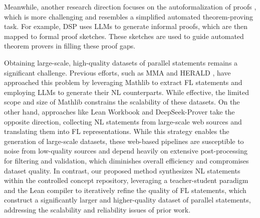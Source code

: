 Meanwhile, another research direction focuses on the autoformalization of proofs \citep{proof_1, proof_2, proof_3, internlm_math_plus}, which is more challenging and resembles a simplified automated theorem-proving task. For example, DSP \citep{proof_1} uses LLMs to generate informal proofs, which are then mapped to formal proof sketches. These sketches are used to guide automated  theorem provers in filling these proof gaps.

Obtaining large-scale, high-quality datasets of parallel statements remains a significant challenge. Previous efforts, such as MMA \citep{mma} and HERALD \citep{herald}, have approached this problem by leveraging Mathlib to extract FL statements and employing LLMs to generate their NL counterparts. While effective, the limited scope and size of Mathlib constrains the scalability of these datasets. On the other hand, approaches like Lean Workbook \citep{lean_workbook} and DeepSeek-Prover \citep{deepseek_prover} take the opposite direction, collecting NL statements from large-scale web sources and translating them into FL representations. While this strategy enables the generation of large-scale datasets, these web-based pipelines are susceptible to noise from low-quality sources and depend heavily on extensive post-processing for filtering and validation, which diminishes overall efficiency and compromises dataset quality. In contrast, our proposed method synthesizes NL statements within the controlled concept repository, leveraging a teacher-student paradigm and the Lean compiler to iteratively refine the quality of FL statements, which construct a significantly larger and higher-quality dataset of parallel statements, addressing the scalability and reliability issues of prior work.